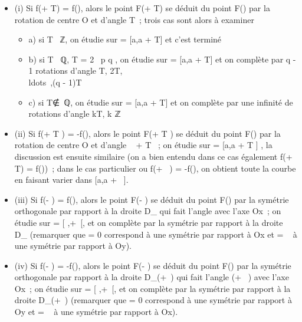 \documentclass[]{article}
\begin{document}
\begin{itemize}
\itemsep1pt\parskip0pt
\item
  (i) Si f(\theta + T) = f(\theta), alors le point F(\theta + T) se déduit du point
  F(\theta) par la rotation de centre O et d'angle T~; trois cas sont alors à
  examiner

  \begin{itemize}
  \itemsep1pt\parskip0pt
  \item
    a) si T \pi~ℤ, on étudie sur \Delta = {[}a,a + T{]} \bigcapD et c'est terminé
  \item
    b) si T \in \pi~ℚ, T = 2\pi~ p \over q , on étudie sur \Delta
    = {[}a,a + T{]} \bigcapD et on complète par q - 1 rotations d'angle T,
    2T,\\ldots~,(q -
    1)T
  \item
    c) si T∉\pi~ℚ, on étudie sur \Delta = {[}a,a +
    T{]} \bigcapD et on complète par une infinité de rotations d'angle kT, k \in
    ℤ
  \end{itemize}
\item
  (ii) Si f(\theta + T  ) = -f(\theta), alors le point
  F(\theta + T  ) se déduit du point F(\theta) par la
  rotation de centre O et d'angle \pi~ + T  ~; on
  étudie sur \Delta = {[}a,a + T  {]} \bigcapD, la
  discussion est ensuite similaire (on a bien entendu dans ce cas
  également f(\theta + T) = f(\theta))~; dans le cas particulier ou f(\theta + \pi~) =
  -f(\theta), on obtient toute la courbe en faisant varier \theta dans {[}a,a +
  \pi~{]}.
\item
  (iii) Si f(\omega - \theta) = f(\theta), alors le point F(\omega - \theta) se déduit du point
  F(\theta) par la symétrie orthogonale par rapport à la droite
  D\_\omega{} qui fait l'angle \omega{} avec l'axe Ox~; on étudie sur \Delta =
  {[} \omega {} ,+\infty~{[}\bigcapD, et on complète par la
  symétrie par rapport à la droite D\_\omega{} (remarquer que \omega = 0
  correspond à une symétrie par rapport à Ox et \omega = \pi~ à une symétrie par
  rapport à Oy).
\item
  (iv) Si f(\omega - \theta) = -f(\theta), alors le point F(\omega - \theta) se déduit du point
  F(\theta) par la symétrie orthogonale par rapport à la droite
  D\_(\omega+\pi~) qui fait l'angle (\omega + \pi~) avec l'axe Ox~; on
  étudie sur \Delta = {[} \omega {} ,+\infty~{[}\bigcapD, et on
  complète par la symétrie par rapport à la droite D\_(\omega+\pi~)
  (remarquer que \omega = 0 correspond à une symétrie par rapport à Oy et \omega =
  \pi~ à une symétrie par rapport à Ox).
\end{itemize}
\end{document}
